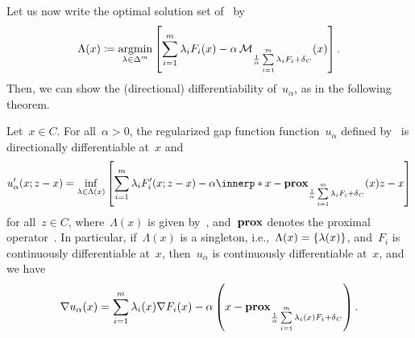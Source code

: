 \documentclass[../../main]{subfiles}
\begin{document}
Let us now write the optimal solution set of~ by
\begin{equation} \label{eq:Lambda}
    \Lambda(x) \coloneqq \argmin_{\lambda \in \simplex^m} \left[ \sum_{i = 1}^{m} \lambda_i F_i(x) - \alpha \envelope_{\frac{1}{\alpha} \sum\limits_{i = 1}^{m} \lambda_i F_i + \indicator_C} (x) \right]
.\end{equation} 
Then, we can show the (directional) differentiability of~$u_\alpha$, as in the following theorem.
\begin{theorem} 
    Let~$x \in C$.
    For all~$\alpha > 0$, the regularized gap function function~$u_\alpha$ defined by~ is directionally differentiable at~$x$ and
    \begin{equation}
        u_\alpha'(x; z - x) = \inf_{\lambda \in \Lambda(x)} \left[ \sum_{i = 1}^{m} \lambda_i F_i'(x; z - x) - \alpha \innerp*{x - \prox_{\frac{1}{\alpha} \sum\limits_{i = 1}^{m} \lambda_i F_i + \indicator_C}(x)}{z - x} \right] 
    \end{equation} 
    for all~$z \in C$, where~$\Lambda(x)$ is given by~, and~$\prox$ denotes the proximal operator~.
    In particular, if~$\Lambda(x)$ is a singleton, i.e.,~$\Lambda(x) = \set*{\lambda(x)}$, and~$F_i$ is continuously differentiable at~$x$, then~$u_\alpha$ is continuously differentiable at~$x$, and we have
    \begin{equation}
        \nabla u_\alpha(x) = \sum_{i = 1}^{m} \lambda_i(x) \nabla F_i(x) - \alpha \left( x - \prox_{\frac{1}{\alpha} \sum\limits_{i = 1}^{m} \lambda_i(x) F_i + \indicator_C} \right) 
    .\end{equation} 
\end{theorem}
\end{document}
